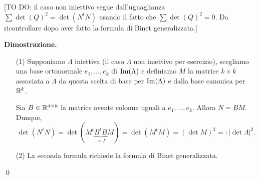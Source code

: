 [TO DO: il caso non iniettivo segue dall'uguaglianza $\sum \det(Q)^2 = \det(N^t N)$ usando il fatto che $\sum \det(Q)^2 = 0$. Da ricontrollare dopo aver fatto la formula di Binet generalizzata.]

\textbf{Dimostrazione.} 
\begin{itemize}

	\item[(1)] Supponiamo $\Lambda$ iniettiva (il caso $\Lambda$ non iniettivo per esercizio), scegliamo una base ortonormale $e_1,\ldots,e_k$ di $\operatorname{Im}(\Lambda)$ e definiamo $M$ la matrice $k \times k$ associata a $\Lambda$ da questa scelta di base per $\operatorname{Im}(\Lambda)$ e dalla base canonica per $\mathbb R^k$.

	Sia $B \in \mathbb R^{d \times k}$ la matrice avente colonne uguali a $e_1,\ldots,e_k$. Allora $N = BM$.
	Dunque, 
	$$
		\det(N^t N) = \det(M^t \underbrace{B^t B}_{= I} M) = \det (M^t M) = (\det M)^2 =: |\det \Lambda|^2.
	$$
	

	\item[(2)] La seconda formula richiede la formula di Binet generalizzata.

\end{itemize}
\qed
